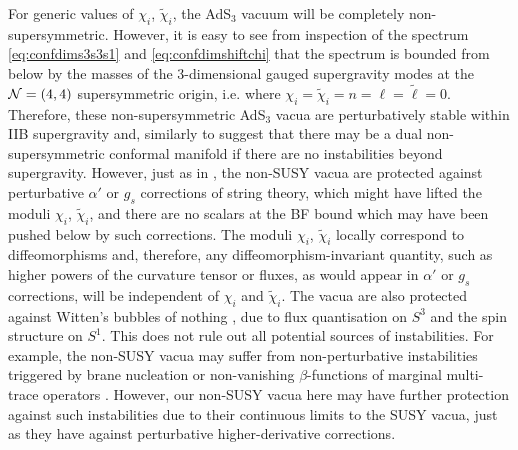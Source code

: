 \documentclass[a4paper, 11pt]{article}
\numberwithin{equation}{section}
\newcommand{\ts}[1]{\widetilde{#1}}
\newcommand{\+}{\oplus}
\begin{document}
For generic values of $\chi_i$, $\ts{\chi}_i$, the AdS$_3$ vacuum will be completely non-supersymmetric. However, it is easy to see from inspection of the spectrum \eqref{eq:confdims3s3s1} and \eqref{eq:confdimshiftchi} that the spectrum is bounded from below by the masses of the 3-dimensional gauged supergravity modes at the ${\cal N}=(4,4)$ supersymmetric origin, i.e. where $\chi_i = \ts{\chi}_i = n = \ell = \ts{\ell} = 0$. Therefore, these non-supersymmetric AdS$_3$ vacua are perturbatively stable within IIB supergravity and, similarly to \cite{Giambrone:2021wsm} suggest that there may be a dual non-supersymmetric conformal manifold if there are no instabilities beyond supergravity. However, just as in \cite{Giambrone:2021wsm}, the non-SUSY vacua are protected against perturbative $\alpha'$ or $g_s$ corrections of string theory, which might have lifted the moduli $\chi_i$, $\ts{\chi}_i$, and there are no scalars at the BF bound which may have been pushed below by such corrections. The moduli $\chi_i$, $\ts{\chi}_i$ locally correspond to diffeomorphisms and, therefore, any diffeomorphism-invariant quantity, such as higher powers of the curvature tensor or fluxes, as would appear in $\alpha'$ or $g_s$ corrections, will be independent of $\chi_i$ and $\ts{\chi}_i$. The vacua are also protected against Witten's bubbles of nothing \cite{Witten:1981gj}, due to flux quantisation on $S^3$ and the spin structure on $S^1$. This does not rule out all potential sources of instabilities. For example, the non-SUSY vacua may suffer from non-perturbative instabilities triggered by brane nucleation \cite{Ooguri:2016pdq,Bomans:2021ara} or non-vanishing $\beta$-functions of marginal multi-trace operators \cite{Witten:2001ua}. However, our non-SUSY vacua here may have further protection against such instabilities due to their continuous limits to the SUSY vacua, just as they have against perturbative higher-derivative corrections.
\end{document}
